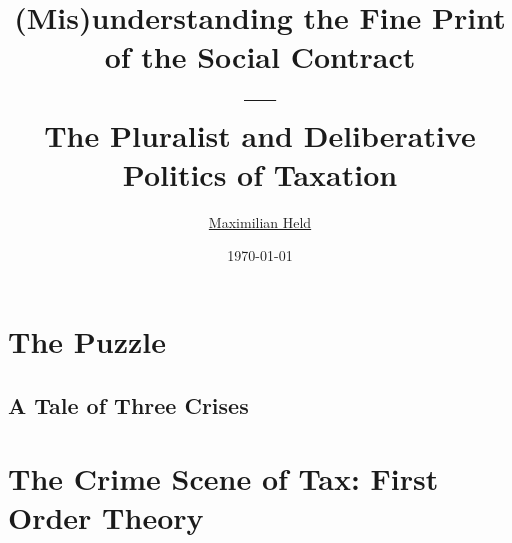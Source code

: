 \documentclass[11pt,a4paper,openright,oneside,titlepage]{book}
\title{
		(Mis)understanding the Fine Print of the Social Contract \\---\\
		The Pluralist and Deliberative Politics of Taxation
	}
\author{
		\href{http://www.maxheld.de}{Maximilian Held}
	}
\date{\today}
\begin{document}
	\pagestyle{headings}

	\maketitle

	

	\setcounter{page}{3}

%	

	

	\newpage

%	

	

	\tableofcontents
		\pagebreak

	

	\listoffigures

	\listoftables

%	

\mainmatter

	


	\part{The Puzzle} \label{part:puzzle}

		

		

		\chapter[Three Crises]{A Tale of Three Crises} \label{chap:3-crises}
			

		

		

		

	\part[The Crime Scene of Tax]
	{The Crime Scene of Tax:
	First Order Theory}
	\label{part:tax}
\end{document}
